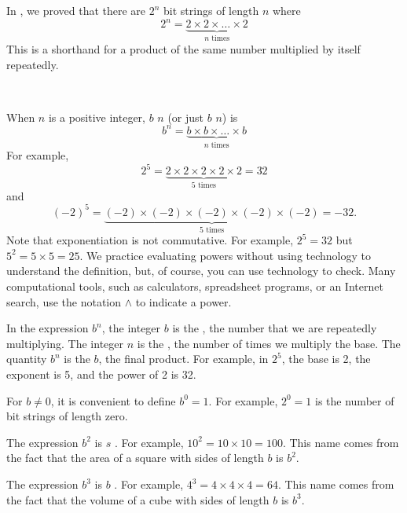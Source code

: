 \subsection{\subexplog}
\label{sub_exp_log}

In , we proved that there are $2^n$ bit strings of length $n$ where
$$2^n=\underbrace{2\times 2 \times \ldots \times 2}_{n \text{ times}}$$
This  is a shorthand for a product of the same number multiplied by itself repeatedly.

\begin{defn} 
\label{defn_exp_notation}
~
    \begin{apart}
        \item When $n$ is a positive integer, $b$  $n$ (or just $b$  $n$) is
        $$b^n = \underbrace{b\times b \times \ldots \times b}_{n \text{ times}}$$
        For example, 
        $$2^5 = \underbrace{2 \times 2 \times 2 \times 2 \times 2}_{5 \text{ times}} = 32$$ 
        and 
        $$(-2)^5 = \underbrace{(-2) \times (-2) \times (-2) \times (-2) \times (-2)}_{5 \text{ times}} = -32.$$ 
        Note that exponentiation is not commutative.  For example, $2^5=32$ but $5^2 = 5 \times 5 = 25$.  We practice evaluating powers without using technology to understand the definition, but, of course, you can use technology to check.  Many computational tools, such as calculators, spreadsheet programs, or an Internet search, use the notation $\land$ to indicate a power.
        \item In the expression $b^n$, the integer $b$ is the , the number that we are repeatedly multiplying.  The integer $n$ is the , the number of times we multiply the base.  The quantity $b^n$ is the  $b$, the final product.  For example, in $2^5$, the base is 2, the exponent is 5, and the power of 2 is 32.  
        \item For $b\neq 0$, it is convenient to define $b^0=1.$  For example, $2^0=1$ is the number of bit strings of length zero.
        \item The expression $b^2$ is $s$ .  For example, $10^2 = 10 \times 10 = 100$. This name comes from the fact that the area of a square with sides of length $b$ is $b^2$.
        \item The expression $b^3$ is $b$ .  For example, $4^3 = 4 \times 4 \times 4 = 64$. This name comes from the fact that the volume of a cube with sides of length $b$ is $b^3$.  
     \end{apart}
\end{defn}

